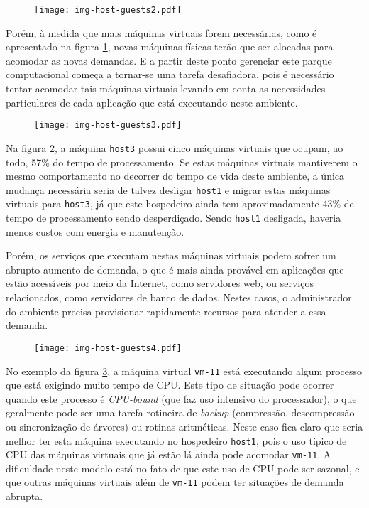 \begin{figure}[htp]
\centering
\texttt{[image: img-host-guests2.pdf]}
\label{fig:hostguests2}
\end{figure}

Porém, à medida que mais máquinas virtuais forem necessárias, como é
apresentado na figura \ref{fig:hostguests2}, novas máquinas físicas terão
que ser alocadas para acomodar as novas demandas. E a partir deste ponto
gerenciar este parque computacional começa a tornar-se uma tarefa
desafiadora, pois é necessário tentar acomodar tais máquinas virtuais
levando em conta as necessidades particulares de cada aplicação que está
executando neste ambiente.

\begin{figure}[htp]
\centering
\texttt{[image: img-host-guests3.pdf]}
\label{fig:hostguests3}
\end{figure}

Na figura \ref{fig:hostguests3}, a máquina \texttt{host3} possui cinco máquinas
virtuais que ocupam, ao todo, 57\% do tempo de processamento. Se estas
máquinas virtuais mantiverem o mesmo comportamento no decorrer do tempo de
vida deste ambiente, a única mudança necessária seria de talvez desligar
\texttt{host1} e migrar estas máquinas virtuais para \texttt{host3}, já que
este hospedeiro ainda tem aproximadamente 43\% de tempo de processamento
sendo desperdiçado. Sendo \texttt{host1} desligada, haveria menos custos
com energia e manutenção.

Porém, os serviços que executam nestas máquinas virtuais podem sofrer um
abrupto aumento de demanda, o que é mais ainda provável em aplicações que
estão acessíveis por meio da Internet, como servidores web, ou serviços
relacionados, como servidores de banco de dados. Nestes casos, o
administrador do ambiente precisa provisionar rapidamente recursos para
atender a essa demanda.

\begin{figure}[htp]
\centering
\texttt{[image: img-host-guests4.pdf]}
\label{fig:hostguests4}
\end{figure}

No exemplo da figura \ref{fig:hostguests4}, a máquina virtual
\texttt{vm-11} está executando algum processo que está exigindo muito tempo
de CPU. Este tipo de situação pode ocorrer quando este processo é
\emph{CPU-bound} (que faz uso intensivo do processador), o que geralmente
pode ser uma tarefa rotineira de \emph{backup} (compressão, descompressão ou
sincronização de árvores) ou rotinas aritméticas. Neste caso fica claro que
seria melhor ter esta máquina executando no hospedeiro \texttt{host1}, pois o
uso típico de CPU das máquinas virtuais que já estão lá ainda pode acomodar
\texttt{vm-11}. A dificuldade neste modelo está no fato de que este uso de CPU
pode ser sazonal, e que outras máquinas virtuais além de \texttt{vm-11} podem
ter situações de demanda abrupta.

